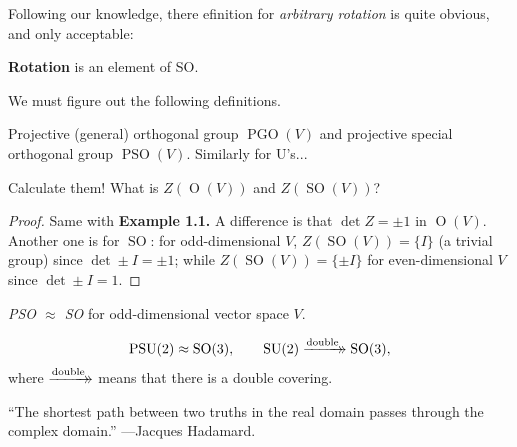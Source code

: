 Following our knowledge, there efinition for \textit{arbitrary rotation} is quite obvious, and only acceptable:

\begin{defn}[rotation] \textbf{Rotation} is an element of SO.\end{defn}

We must figure out the following definitions.
\begin{defn}Projective (general) orthogonal group $\operatorname{PGO}(V)$ and projective special orthogonal group $\operatorname{PSO}(V).$ Similarly for U's...
\end{defn}
\begin{ex}
Calculate them! What is $Z(\operatorname{O}(V))$ and $Z(\operatorname{SO}(V))$?
\end{ex}
\begin{proof}
Same with \textbf{Example 1.1.} A difference is that $\det Z = \pm 1$ in $\operatorname{O}(V).$ Another one is for $\operatorname{SO}$: for odd-dimensional $V$, $Z(\operatorname{SO}(V))=\{I\}$ (a trivial group) since $\operatorname{det}\pm I = \pm 1$; while $Z(\operatorname{SO}(V))=\{\pm I\}$ for even-dimensional $V$ since $\operatorname{det}\pm I = 1.$
\end{proof}
\begin{coro}
\emph{PSO $\approx$ SO} for odd-dimensional vector space $V$.
\end{coro}
\begin{prop}
$$\operatorname{PSU}(2)\approx \operatorname{SO}(3), \qquad \operatorname{SU}(2) \dhxrightarrow{\text{double}} \operatorname{SO}(3),$$ where $\dhxrightarrow{\text{double}}$ means that there is a double covering.
\end{prop}

``The shortest path between two truths in the real domain passes through the complex domain.'' ---Jacques Hadamard.

